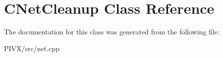 \hypertarget{class_c_net_cleanup}{}\section{C\+Net\+Cleanup Class Reference}
\label{class_c_net_cleanup}


The documentation for this class was generated from the following file\+:\begin{DoxyCompactItemize}
\item 
P\+I\+V\+X/src/net.\+cpp\end{DoxyCompactItemize}
